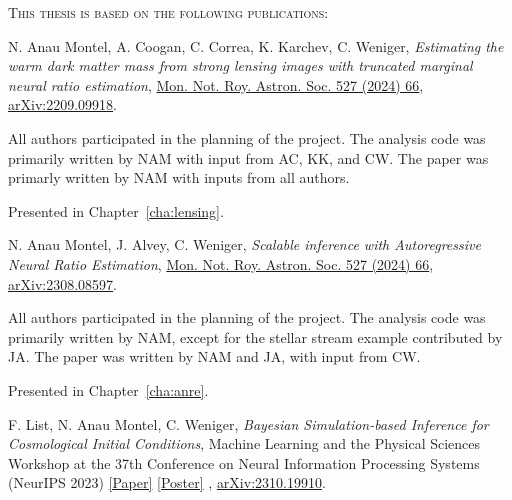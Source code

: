
{\scshape This thesis is based on the following publications:} \vskip 20pt


\begin{itemize}[]

{\selectfont

\item [\cite{Montel:2022fhv}]

{N. Anau Montel}, A. Coogan, C. Correa, K. Karchev, C. Weniger, \textit{Estimating the warm dark matter mass from strong lensing images with truncated marginal neural ratio estimation}, 
\href{https://doi.org/10.1093/mnras/stad2925}{Mon. Not. Roy. Astron. Soc. 527 (2024) 66}, \href{https://arxiv.org/abs/2209.09918}{\ttfamily arXiv:2209.09918}. \vskip 5pt

{All authors participated in the planning of the project. The analysis code was primarily written by NAM with input from AC, KK, and CW. The paper was primarly written by NAM with inputs from all authors.}   \vskip 5pt

Presented in Chapter~\ref{cha:lensing}.\vskip 10pt
 

\item[\cite{AnauMontel:2023stj}] 
{N. Anau Montel}, J. Alvey, C. Weniger, \textit{Scalable inference with Autoregressive Neural Ratio Estimation}, \href{https://doi.org/10.1093/mnras/stae1130}{Mon. Not. Roy. Astron. Soc. 527 (2024) 66},  \href{https://arxiv.org/abs/2308.08597}{\ttfamily arXiv:2308.08597}.  \vskip 5pt

{All authors participated in the planning of the project. The analysis code was primarily written by NAM, except for the stellar stream example contributed by JA. The paper was written by NAM and JA, with input from CW.}   \vskip 5pt

Presented in Chapter~\ref{cha:anre}. \vskip 10pt


\item[\cite{List:2023aa}] 
F. List, {N. Anau Montel}, C. Weniger, \textit{Bayesian Simulation-based Inference for Cosmological Initial Conditions}, Machine Learning and the Physical Sciences Workshop at the 37th Conference on Neural Information Processing Systems (NeurIPS 2023) \href{https://ml4physicalsciences.github.io/2023/files/NeurIPS_ML4PS_2023_218.pdf}{[Paper]} \href{https://nips.cc/media/PosterPDFs/NeurIPS%202023/76248.png}{[Poster]} ,  \href{https://arxiv.org/abs/2310.19910}{\ttfamily arXiv:2310.19910}.  \vskip 5pt

}
\end{itemize}
